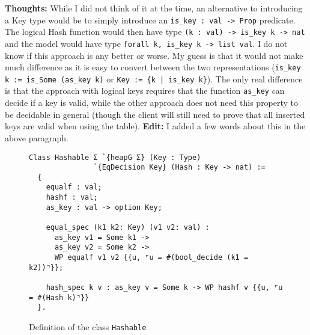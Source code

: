 \documentclass[10pt,a4paper]{article}
\renewcommand{\fcolorbox}[4][]{#4}}
\newcommand{\thoughts}[1]{\noindent\fcolorbox{black}{cyan}{\parbox{\textwidth}{\textbf{Thoughts:} \linebreak #1}}}
\begin{document}
\thoughts{While I did not think of it at the time, an alternative to introducing a Key type would be to simply introduce an \texttt{is\_key : val -> Prop} predicate. The logical Hash function would then have type \texttt{(k : val) -> is\_key k -> nat} and the model would have type \texttt{forall k, is\_key k -> list val}. I do not know if this approach is any better or worse. My guess is that it would not make much difference as it is easy to convert between the two representations (\texttt{is\_key k := is\_Some (as\_key k)} or \texttt{Key := \{k | is\_key k\}}). The only real difference is that the approach with logical keys requires that the function \texttt{as\_key} can decide if a key is valid, while the other approach does not need this property to be decidable in general (though the client will still need to prove that all inserted keys are valid when using the table). \textbf{Edit:} I added a few words about this in the above paragraph.}

\begin{figure}
\begin{verbatim}
Class Hashable Σ `{heapG Σ} (Key : Type)
               `{EqDecision Key} (Hash : Key -> nat) :=
  { 
    equalf : val;
    hashf : val;
    as_key : val -> option Key;
    
    equal_spec (k1 k2: Key) (v1 v2: val) :
      as_key v1 = Some k1 ->
      as_key v2 = Some k2 ->
      WP equalf v1 v2 {{u, ⌜u = #(bool_decide (k1 = k2))⌝}};
      
    hash_spec k v : as_key v = Some k -> WP hashf v {{u, ⌜u = #(Hash k)⌝}} 
  }.

\end{verbatim}
\caption{Definition of the class \texttt{Hashable}}
\label{fig:hashable}
\end{figure}
\end{document}
